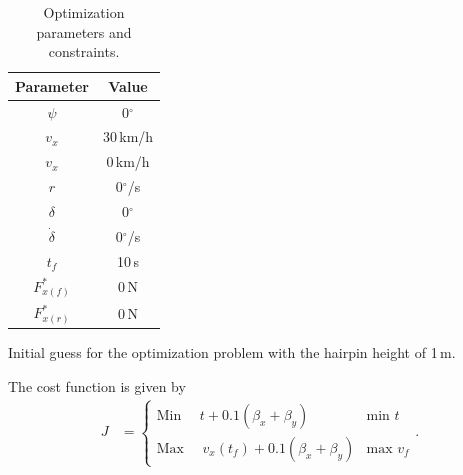 \begin{table}[h!]
\begin{subtable}{0.3\textwidth}
        \label{tab:st_init}
    \end{subtable}
    \hfill
    \begin{subtable}{0.3\textwidth}
        \begin{tabular}{c|c}
            Parameter & Value \\
            \hline
            $\psi$ & 0$^\circ$\\
            $v_x$ & 30\,km/h\\
            $v_x$ & 0\,km/h\\
            $r$ & 0$^\circ$/s\\
            $\delta$ & 0$^\circ$\\
            $\dot \delta$ & 0$^\circ$/s\\
            $t_f$ & 10\,s\\
            $F_{x(f)}^*$ & 0\,N\\
            $F_{x(r)}^*$ & 0\,N\\
        \end{tabular}
        \caption{Initial guess for the optimization problem with the hairpin height of 1\,m.}
        \label{tab:st_guess}
    \end{subtable}
    \caption{Optimization parameters and constraints.}
\end{table}

The cost function is given by
\begin{align}
    J &= \begin{cases} 
            \text{Min }\quad t + 0.1\left(\beta_x + \beta_y\right) & \text{min } t \\
            \text{Max }\quad v_x(t_f) + 0.1\left(\beta_x + \beta_y\right) & \text{max } v_f 
         \end{cases}.
\end{align}
